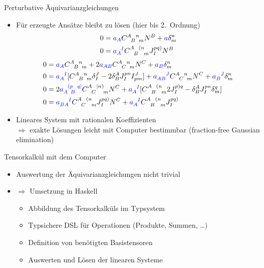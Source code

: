 \documentclass{beamer}
\newcommand{\gmc}[4]{\ensuremath{C^{#1\hphantom{#2}#3}_{\hphantom{#1}{#2}\hphantom{#3}#4}}}
\begin{document}
    \begin{frame}{Perturbative Äquivarianzgleichungen}
        \begin{itemize}
            \item Für erzeugte Ansätze bleibt zu lösen (hier bis 2.\ Ordnung)
            \begin{align*}
                0 &{} = {\color{blue}a_A} \gmc{A}{B}{n}{m} N^B + {\color{blue}a} \delta^n_m \\
                0 &{} = {\color{blue}a_A^{\hphantom AI}}\gmc{A}{B}{(n}{m} J^{pq)}_I N^B
            \end{align*}
            \begin{align*}
                0 &{} = {\color{blue}a_A} \gmc{A}{B}{n}{m} + 2 {\color{blue}a_{AB}} \gmc{A}{C}{n}{m} N^C + {\color{blue}a_B} \delta^n_m \\
                0 &{} = {\color{blue}a_A^{\hphantom AI}}\lbrack \gmc{A}{B}{n}{m} \delta^J_I - 2\delta^A_B J^{pn}_I I^J_{pm}\rbrack + {\color{blue}a_{AB}^{\hphantom{AB}J}}\gmc{A}{C}{n}{m} N^C + {\color{blue}a_B^{\hphantom BJ}} \delta^n_m \\
                0 &{} = 2{\color{blue}a_{A \hphantom pB}^{\hphantom A(p\hphantom Bq\mid}} \gmc{A}{C}{\mid n)}{m} N^C + {\color{blue}a_A^{\hphantom AI}}\lbrack \gmc{A}{B}{(n}{m} 2J^{p)q}_I - \delta^A_B J^{pn}_I \delta^q_m\rbrack \\
                0 &{} = {\color{blue}a_{BA}^{\hphantom{BA}I}} \gmc{A}{C}{(n}{m} J^{pq)}_I N^C + {\color{blue}a_A^{\hphantom AI}}\gmc{A}{B}{(n}{m} J^{pq)}_I
            \end{align*}
            \item Lineares System mit rationalen Koeffizienten \\
            $\Rightarrow$ exakte Lösungen leicht mit Computer bestimmbar (fraction-free Gaussian elimination)
        \end{itemize}
    \end{frame}

    \begin{frame}{Tensorkalkül mit dem Computer}
        \begin{itemize}
            \item Auswertung der Äquivarianzgleichungen nicht trivial
            \item $\Rightarrow$ Umsetzung in Haskell
            \begin{itemize}
                \item Abbildung des Tensorkalküls im Typsystem
                \item Typsichere DSL für Operationen (Produkte, Summen, \ldots)
                \item Definition von benötigten Basistensoren
                \item Auswerten und Lösen der linearen Systeme
            \end{itemize}
        \end{itemize}
    \end{frame}
\end{document}

